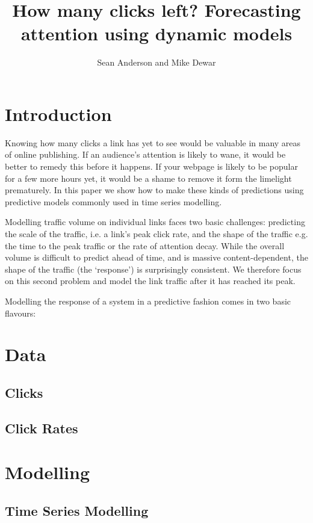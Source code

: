 \documentclass{article}
\title{How many clicks left? Forecasting attention using dynamic models}
\author{Sean Anderson and Mike Dewar}
\begin{document}
    
    \maketitle
    
    \section{Introduction}
    
    Knowing how many clicks a link has yet to see would be valuable in many areas of online publishing. If an audience's attention is likely to wane, it would be better to remedy this before it happens. If your webpage is likely  to be popular for a few more hours yet, it would be a shame to remove it form the limelight prematurely. In this paper we show how to make these kinds of predictions using predictive models commonly used in time series modelling.
    
    Modelling traffic volume on individual links faces two basic challenges: predicting the scale of the traffic, i.e. a link's peak click rate, and the shape of the traffic e.g. the time to the peak traffic or the rate of attention decay. While the overall volume is difficult to predict ahead of time, and is massive content-dependent, the shape of the traffic (the `response') is surprisingly consistent. We therefore focus on this second problem and model the link traffic after it has reached its peak.
    
    Modelling the response of a system in a predictive fashion comes in two basic flavours: 
    
    
    \section{Data}
    
    \subsection{Clicks}
    
    \subsection{Click Rates}
    
    \section{Modelling}
    
    \subsection{Time Series Modelling}
    
\end{document}
